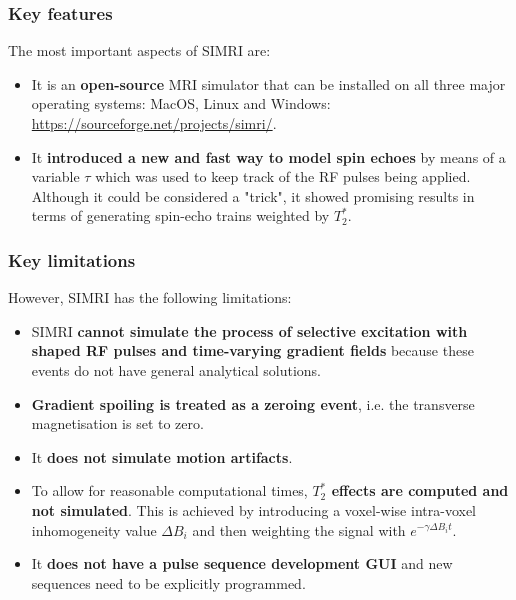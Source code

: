 \hfill

\subsubsection{Key features}
The most important aspects of SIMRI are:
\begin{itemize}

    \item It is an \textbf{open-source} MRI simulator that can be installed on all three major operating systems: MacOS, Linux and Windows: \url{https://sourceforge.net/projects/simri/}.
    
    
    \item It \textbf{introduced a new and fast way to model spin echoes} by means of a variable $\tau$ which was used to keep track of the RF pulses being applied. 
    Although it could be considered a "trick", it showed promising results in terms of generating spin-echo trains weighted by $T_2^*$.
    
\end{itemize}

\hfill

\subsubsection{Key limitations}
However, SIMRI has the following limitations:
\begin{itemize}
    
    \item SIMRI \textbf{cannot simulate the process of selective excitation with shaped RF pulses and time-varying gradient fields} because these events do not have general analytical solutions.
    
    \item \textbf{Gradient spoiling is treated as a zeroing event}, i.e. the transverse magnetisation is set to zero.
    
    \item It \textbf{does not simulate motion artifacts}.
    
    \item To allow for reasonable computational times, \textbf{$T_2^*$ effects are computed and not simulated}.
    This is achieved by introducing a voxel-wise intra-voxel inhomogeneity value $\Delta B_i$ and then weighting the signal with $e^{- \gamma \Delta B_i t}$.
    
    \item It \textbf{does not have a pulse sequence development GUI} and new sequences need to be explicitly programmed.
    
\end{itemize}

